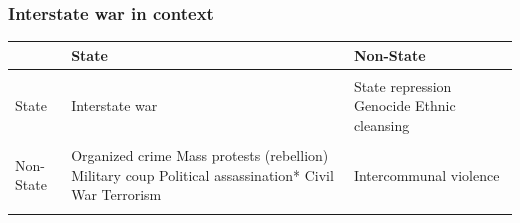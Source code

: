 \documentclass[aspectratio=43]{beamer}
\begin{document}

%
%


\begin{frame}
\frametitle{Interstate war in context}
\centering

\begin{tabular}{m{1.75cm}|m{4cm}m{4cm}}
& {\color{gray}{\footnotesize Target:}} \newline State & {\color{gray}{\footnotesize Target:}} \newline Non-State \\\hline\\
{\color{gray}{\footnotesize Perpetrator:}} \newline State & Interstate war & State repression \newline Genocide \newline Ethnic cleansing \\\\
{\color{gray}{\footnotesize Perpetrator:}} \newline Non-State & Organized crime \newline Mass protests (rebellion) \newline Military coup \newline Political assassination* \newline Civil War \newline Terrorism & Intercommunal violence\\\\\hline
\end{tabular}

\end{frame}
\end{document}
